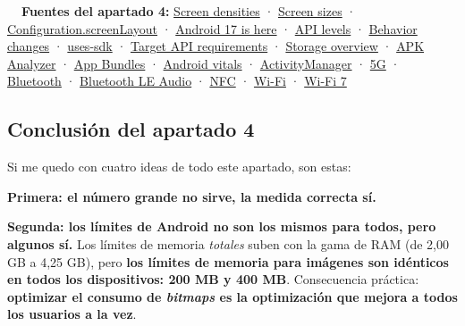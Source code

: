 \documentclass[11pt,a4paper]{article}
\begin{document}
	\begin{fuentesbox}
		\textbf{\color{muted}\faBook\ \ Fuentes del apartado 4:}
		\href{https://developer.android.com/training/multiscreen/screendensities}{Screen densities} ·
		\href{https://developer.android.com/training/multiscreen/screensizes}{Screen sizes} ·
		\href{https://developer.android.com/reference/android/content/res/Configuration}{Configuration.screenLayout} ·
		\href{https://developer.android.com/blog/posts/android-17-is-here}{Android 17 is here} ·
		\href{https://developer.android.com/tools/releases/platforms}{API levels} ·
		\href{https://developer.android.com/about/versions/17/behavior-changes-all}{Behavior changes} ·
		\href{https://developer.android.com/guide/topics/manifest/uses-sdk-element}{uses-sdk} ·
		\href{https://support.google.com/googleplay/android-developer/answer/11926878}{Target API requirements} ·
		\href{https://developer.android.com/training/data-storage}{Storage overview} ·
		\href{https://developer.android.com/studio/debug/apk-analyzer}{APK Analyzer} ·
		\href{https://developer.android.com/guide/app-bundle/dynamic-delivery}{App Bundles} ·
		\href{https://developer.android.com/topic/performance/vitals}{Android vitals} ·
		\href{https://developer.android.com/reference/android/app/ActivityManager}{ActivityManager} ·
		\href{https://developer.android.com/develop/connectivity/5g}{5G} ·
		\href{https://developer.android.com/develop/connectivity/bluetooth}{Bluetooth} ·
		\href{https://developer.android.com/develop/connectivity/bluetooth/ble-audio/overview}{Bluetooth LE Audio} ·
		\href{https://developer.android.com/develop/connectivity/nfc}{NFC} ·
		\href{https://developer.android.com/develop/connectivity/wifi}{Wi-Fi} ·
		\href{https://source.android.com/docs/core/connect/wifi-7}{Wi-Fi 7}
	\end{fuentesbox}
	
	\subsection{Conclusión del apartado 4}
	
	Si me quedo con cuatro ideas de todo este apartado, son estas:
	
	\textbf{Primera: el número grande no sirve, la medida correcta sí.}
	
	\textbf{Segunda: los límites de Android no son los mismos para todos, pero algunos sí.} Los límites de memoria \emph{totales} suben con la gama de RAM (de 2,00 GB a 4,25 GB), pero \textbf{los límites de memoria para imágenes son idénticos en todos los dispositivos: 200 MB y 400 MB}. Consecuencia práctica: \textbf{optimizar el consumo de \emph{bitmaps} es la optimización que mejora a todos los usuarios a la vez}.
	
\end{document}

